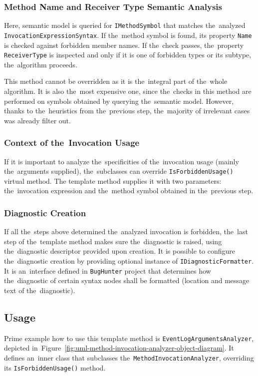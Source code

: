 \documentclass[
  digital, %
  table,   %
  lof,     %
  lot,     %
  oneside,
]{fithesis3}
\begin{document}

\subsubsection{\textbf{Method Name and Receiver Type Semantic Analysis}}
Here, semantic model is queried for \texttt{IMethodSymbol} that matches the~analyzed \texttt{InvocationExpressionSyntax}. If the~method symbol is found, its property \texttt{Name} is checked against forbidden member names. If the~check passes, the~property \texttt{ReceiverType} is inspected and only if it is one of forbidden types or its subtype, the~algorithm proceeds. 

This method cannot be overridden as it is the~integral part of the~whole algorithm. It is also the~most expensive one, since the~checks in this method are performed on symbols obtained by querying the~semantic model. However, thanks to the~heuristics from the~previous step, the~majority of irrelevant cases was already filter out.

\subsubsection{\textbf{Context of the~Invocation Usage}}
If it is important to analyze the~specificities of the~invocation usage (mainly the~arguments supplied), the~subclasses can override \texttt{IsForbiddenUsage()} virtual method. The template method supplies it with two parameters: the~invocation expression and the~method symbol obtained in the~previous step.

\subsubsection{\textbf{Diagnostic Creation}}
If all the~steps above determined the~analyzed invocation is forbidden, the~last step of the~template method makes sure the~diagnostic is raised, using the~diagnostic descriptor provided upon creation. It is possible to configure the~diagnostic creation by providing optional instance of \texttt{IDiagnosticFormatter}. It is an~interface defined in \texttt{BugHunter} project that determines how the~diagnostic of certain syntax nodes shall be formatted (location and message text of the~diagnostic).

\subsection{Usage}
\label{sec:method-invocation-analyzer-usage}
Prime example how to use this template method is \texttt{EventLogArgumentsAnalyzer}, depicted in~Figure~\ref{fig:uml-method-invocation-analyzer-object-diagram}. It defines an~inner class that subclasses the~\texttt{MethodInvocationAnalyzer}, overriding its \texttt{IsForbiddenUsage()} method.
\end{document}
